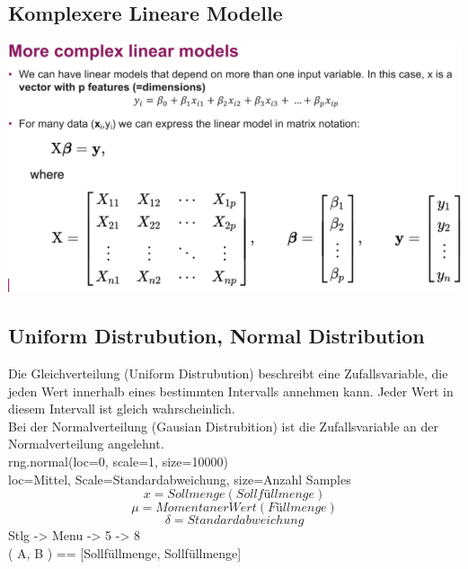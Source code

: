 \subsection{Komplexere Lineare Modelle}
\includegraphics[width=\linewidth]{img/komplexere_lineare_modelle.png}
\subsection{Uniform Distrubution, Normal Distribution}
Die Gleichverteilung (Uniform Distrubution) beschreibt eine Zufallsvariable, die jeden Wert innerhalb eines bestimmten
Intervalls annehmen kann. Jeder Wert in diesem Intervall ist gleich wahrscheinlich.\\
Bei der Normalverteilung (Gausian Distrubition) ist die Zufallsvariable an der Normalverteilung angelehnt.\\
rng.normal(loc=0, scale=1, size=10000)\\
loc=Mittel, Scale=Standardabweichung, size=Anzahl Samples
$$x = Sollmenge (Sollfüllmenge)$$
$$\mu = Momentaner Wert (Füllmenge)$$
$$ \delta = Standardabweichung $$
Stlg -> Menu -> 5 -> 8\\
( A, B ) == [Sollfüllmenge, Sollfüllmenge]
